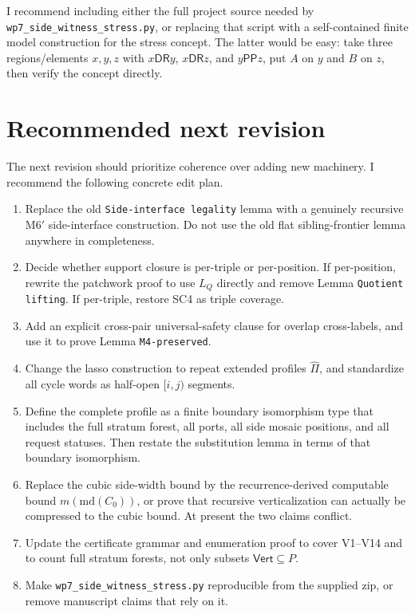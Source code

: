 \documentclass[11pt]{article}
\newcommand{\DR}{\mathsf{DR}}
\newcommand{\PP}{\mathsf{PP}}
\newcommand{\Vrt}{\mathsf{Vert}}
\begin{document}
I recommend including either the full project source needed by
\texttt{wp7\_side\_witness\_stress.py}, or replacing that script with a
self-contained finite model construction for the stress concept.  The latter
would be easy: take three regions/elements $x,y,z$ with $x\DR y$, $x\DR z$, and
$y\PP z$, put $A$ on $y$ and $B$ on $z$, then verify the concept directly.

\section{Recommended next revision}

The next revision should prioritize coherence over adding new machinery.  I
recommend the following concrete edit plan.

\begin{enumerate}[leftmargin=2em,label=(R\arabic*)]
  \item Replace the old \texttt{Side-interface legality} lemma with a genuinely
        recursive M6$'$ side-interface construction.  Do not use the old flat
        sibling-frontier lemma anywhere in completeness.
  \item Decide whether support closure is per-triple or per-position.  If
        per-position, rewrite the patchwork proof to use $L_Q$ directly and
        remove Lemma \texttt{Quotient lifting}.  If per-triple, restore SC4 as
        triple coverage.
  \item Add an explicit cross-pair universal-safety clause for overlap
        cross-labels, and use it to prove Lemma \texttt{M4-preserved}.
  \item Change the lasso construction to repeat extended profiles
        $\widehat\Pi$, and standardize all cycle words as half-open
        $[i,j)$ segments.
  \item Define the complete profile as a finite boundary isomorphism type that
        includes the full stratum forest, all ports, all side mosaic positions,
        and all request statuses.  Then restate the substitution lemma in terms
        of that boundary isomorphism.
  \item Replace the cubic side-width bound by the recurrence-derived computable
        bound $m(\mathrm{md}(C_0))$, or prove that recursive verticalization can
        actually be compressed to the cubic bound.  At present the two claims
        conflict.
  \item Update the certificate grammar and enumeration proof to cover V1--V14
        and to count full stratum forests, not only subsets $\Vrt\subseteq P$.
  \item Make \texttt{wp7\_side\_witness\_stress.py} reproducible from the
        supplied zip, or remove manuscript claims that rely on it.
\end{enumerate}
\end{document}
